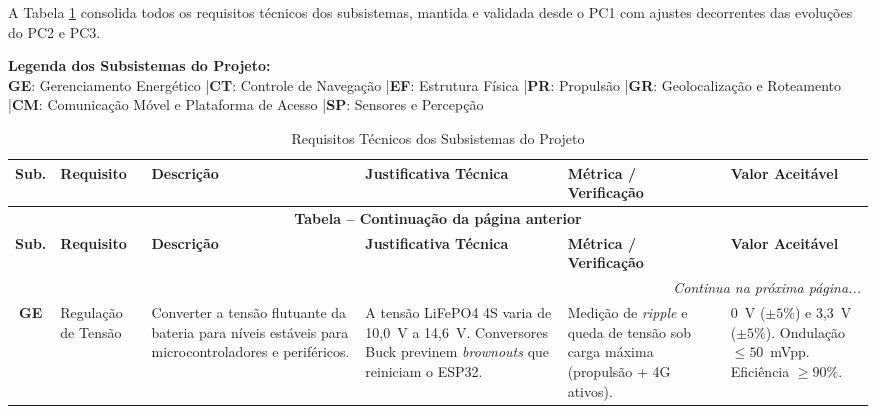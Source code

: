 \documentclass[12pt,a4paper]{article}
\begin{document}
A Tabela \ref{tab:requisitos_tecnicos} consolida todos os requisitos técnicos dos subsistemas, mantida e validada desde o PC1 com ajustes decorrentes das evoluções do PC2 e PC3.

\vspace{0.5cm}
\noindent\footnotesize\textbf{Legenda dos Subsistemas do Projeto:}\\
\textbf{GE}: Gerenciamento Energético \quad|\quad \textbf{CT}: Controle de Navegação \quad|\quad \textbf{EF}: Estrutura Física \quad|\quad \textbf{PR}: Propulsão \quad|\quad \textbf{GR}: Geolocalização e Roteamento \quad|\quad \textbf{CM}: Comunicação Móvel e Plataforma de Acesso \quad|\quad \textbf{SP}: Sensores e Percepção
\vspace{0.3cm}
\normalsize

\renewcommand{\arraystretch}{1.3}
{
\small
\begin{longtable}{| c | >{\raggedright\arraybackslash}p{} | >{\raggedright\arraybackslash}p{} | >{\raggedright\arraybackslash}p{} | >{\raggedright\arraybackslash}p{} | >{\raggedright\arraybackslash}p{} |}

\caption{Requisitos Técnicos dos Subsistemas do Projeto}
\label{tab:requisitos_tecnicos} \\

\hline
\textbf{Sub.} & \textbf{Requisito} & \textbf{Descrição} & \textbf{Justificativa Técnica} & \textbf{Métrica / Verificação} & \textbf{Valor Aceitável} \\ \hline
\endfirsthead
\multicolumn{6}{c}{{\bfseries Tabela \thetable{} -- Continuação da página anterior}} \\
\hline
\textbf{Sub.} & \textbf{Requisito} & \textbf{Descrição} & \textbf{Justificativa Técnica} & \textbf{Métrica / Verificação} & \textbf{Valor Aceitável} \\ \hline
\endhead
\hline \multicolumn{6}{|r|}{{\textit{Continua na próxima página...}}} \\ \hline
\endfoot
\hline
\endlastfoot

\textbf{GE} & Regulação de Tensão & Converter a tensão flutuante da bateria para níveis estáveis para microcontroladores e periféricos. & A tensão LiFePO4 4S varia de 10{,}0~V a 14{,}6~V. Conversores Buck previnem \textit{brownouts} que reiniciam o ESP32. & Medição de \textit{ripple} e queda de tensão sob carga máxima (propulsão + 4G ativos). & 5{,}0~V ($\pm 5\%$) e 3{,}3~V ($\pm 5\%$). Ondulação $\le 50$~mVpp. Eficiência $\ge 90\%$. \\ \hline


\end{longtable}}
\end{document}
